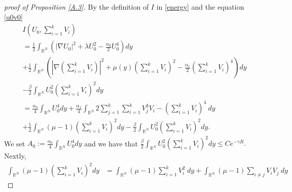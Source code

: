 \documentclass{amsart}
\theoremstyle{definition}
\theoremstyle{remark}
\numberwithin{equation}{section}
\begin{document}
\begin{proof}[proof of Proposition \ref{A.3}] By the definition of $I$ in \eqref{energy} and the equation \eqref{u0v0}%
\begin{equation}
\begin{aligned}\label{f1}
&I\left(U_0,  \sum_{i=1}^k V_{i}\right)\\&= \frac{1}{2} \int_{\mathbb{R}^{N}}\left(|\nabla U_0|^{2}+\lambda U_0^{2}-\frac{\alpha_0}{2} U_0^{4}\right)dy
\\&+
 \frac{1}{2} \int_{\mathbb{R}^{N}}\left(\left|\nabla\left( \sum_{i=1}^k V_{i}\right)\right|^{2}+\mu(y) \left( \sum_{i=1}^k V_{i}\right)^{2} -\frac{\alpha_1}{2} \left( \sum_{i=1}^k V_{i}\right)^{4}\right) d y\\
 &-\frac{\beta}{2}\int_{\mathbb{R}^N}U_0^{2} \left( \sum_{i=1}^k V_{i}\right)^{2} d y\\
 &= \frac{\alpha_0}{4} \int_{\mathbb{R}^{N}} U_0^{4}dy + \frac{\alpha_1}{4}\int_{\mathbb{R}^{N}} 2\sum_{j=1}^{k} \sum_{i=1}^{k} V_j^{3} V_i - \left(\sum_{i=1}^k V_i\right)^4\:dy\\
 &+\frac{1}{2} \int_{\mathbb{R}^{N}}\left(\mu-1\right) \left( \sum_{i=1}^k V_{i}\right)^{2}  d y -\frac{\beta}{2}\int_{\mathbb{R}^N}U_0^{2} \left( \sum_{i=1}^k V_{i}\right)^{2} d y.
 \end{aligned}
\end{equation}
We set $\displaystyle A_0:=\frac{\alpha_0}{4} \int_{\mathbb{R}^{N}} U_0^{4}dy$ and we have that $\displaystyle \frac{\beta}{2}\int_{\mathbb{R}^N}U_0^{2} \left( \sum_{i=1}^k V_{i}\right)^{2} d y \le C e^{-\gamma R}.$ Nextly,
\begin{equation}
\begin{aligned}\label{f3}
\int_{\mathbb{R}^{N}}(\mu-1) \left( \sum_{i=1}^k V_{i}\right)^{2}dy&=\int_{\mathbb{R}^{N}}(\mu-1) \sum_{i=1}^k V_{i}^2 \:dy +  \int_{\mathbb{R}^N}(\mu-1)  \sum_{i\ne j} V_iV_j\:dy

\end{aligned}
\end{equation}
\end{proof}
\end{document}
